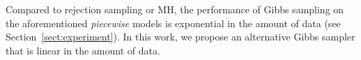 Compared to rejection sampling or MH, the performance of Gibbs sampling on the aforementioned \emph{piecewise} models is exponential in the amount of data (see Section~\ref{sect:experiment}).  
In this work, we propose an alternative Gibbs sampler that is linear in the amount of data.


